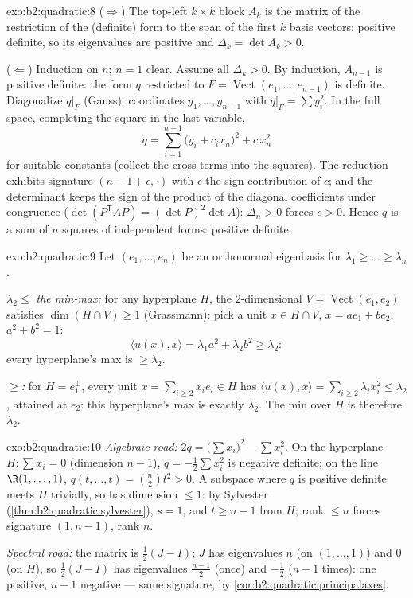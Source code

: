\begin{solution}{exo:b2:quadratic:8}
($\Rightarrow$) The top-left $k \times k$ block $A_k$ is the matrix
of the restriction of the (definite) form to the span of the first
$k$ basis vectors: positive definite, so its eigenvalues are
positive and $\Delta_k = \det A_k > 0$.

($\Leftarrow$) Induction on $n$; $n = 1$ clear. Assume all
$\Delta_k > 0$. By induction, $A_{n-1}$ is positive definite: the
form $q$ restricted to $F = \operatorname{Vect}(e_1, \dots,
e_{n-1})$ is definite. Diagonalize $q|_F$ (Gauss): coordinates
$y_1, \dots, y_{n-1}$ with $q|_F = \sum y_i^2$. In the full space,
completing the square in the last variable,
\[
q = \sum_{i=1}^{n-1} \bigl(y_i + c_i x_n\bigr)^2 + c\,x_n^2
\]
for suitable constants (collect the cross terms into the squares).
The reduction exhibits signature $(n-1 + \epsilon, \cdot)$ with
$\epsilon$ the sign contribution of $c$; and the determinant keeps
the sign of the product of the diagonal coefficients under
congruence ($\det(P^{\mathsf T}AP) = (\det P)^2\det A$): $\Delta_n
> 0$ forces $c > 0$. Hence $q$ is a sum of $n$ squares of
independent forms: positive definite.
\end{solution}

\begin{solution}{exo:b2:quadratic:9}
Let $(e_1, \dots, e_n)$ be an orthonormal eigenbasis for $\lambda_1
\geq \dots \geq \lambda_n$.

\emph{$\lambda_2 \leq$ the min-max:} for any hyperplane $H$, the
$2$-dimensional $V = \operatorname{Vect}(e_1, e_2)$ satisfies
$\dim(H \cap V) \geq 1$ (Grassmann): pick a unit $x \in H \cap V$,
$x = ae_1 + be_2$, $a^2 + b^2 = 1$:
\[
\langle u(x), x\rangle = \lambda_1 a^2 + \lambda_2 b^2 \geq
\lambda_2 :
\]
every hyperplane's max is $\geq \lambda_2$.

\emph{$\geq$:} for $H = e_1^{\perp}$, every unit $x = \sum_{i\geq2}
x_ie_i \in H$ has $\langle u(x), x\rangle = \sum_{i \geq 2}
\lambda_i x_i^2 \leq \lambda_2$, attained at $e_2$: this
hyperplane's max is exactly $\lambda_2$. The min over $H$ is
therefore $\lambda_2$.
\end{solution}

\begin{solution}{exo:b2:quadratic:10}
\emph{Algebraic road:} $2q = \bigl(\sum x_i\bigr)^2 - \sum
x_i^2$. On the hyperplane $H : \sum x_i = 0$ (dimension $n -
1$), $q = -\frac12\sum x_i^2$ is negative definite; on the line
$\R(1, \dots, 1)$, $q(t, \dots, t) = \binom n2 t^2 > 0$. A
subspace where $q$ is positive definite meets $H$ trivially, so
has dimension $\leq 1$: by Sylvester
(\cref{thm:b2:quadratic:sylvester}), $s = 1$, and $t \geq n-1$
from $H$; rank $\leq n$ forces signature $(1, n-1)$, rank $n$.

\emph{Spectral road:} the matrix is $\frac12(J - I)$; $J$ has
eigenvalues $n$ (on $(1,\dots,1)$) and $0$ (on $H$), so
$\frac12(J-I)$ has eigenvalues $\frac{n-1}{2}$ (once) and
$-\frac12$ ($n-1$ times): one positive, $n-1$ negative --- same
signature, by \cref{cor:b2:quadratic:principalaxes}.
\end{solution}

